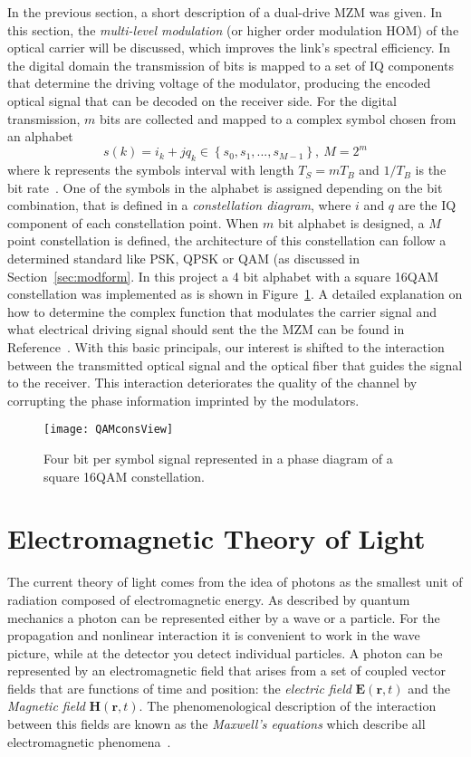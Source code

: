 In the previous section, a short description of a dual-drive MZM was given. In this section,  the \textit{multi-level modulation} (or higher order modulation HOM) of the optical carrier will be discussed, which improves the link's spectral efficiency. In the digital domain the transmission of bits is mapped to a set of IQ components that determine the driving voltage of the modulator, producing the encoded optical signal that can be decoded on the receiver side. For the digital transmission, $m$ bits are collected and mapped to a complex symbol chosen from an alphabet
\begin{equation}
s(k)=i_{k}+jq_{k} \in \left\{s_{0},s_{1},...,s_{M-1}\right\},\ M=2^{m} 
\end{equation}
where k represents the symbols interval with length $T_{S}=mT_{B}$ and $1/T_{B}$ is the bit rate~\cite{seimetz2005multi}. One of the symbols in the alphabet is assigned depending on the bit combination, that is defined in a \textit{constellation diagram}, where $i$ and $q$ are the IQ component of each constellation point. When $m$ bit alphabet is designed, a $M$ point constellation is defined, the architecture of this constellation can follow a determined standard like PSK, QPSK or QAM (as discussed in Section~\ref{sec:modform}. In this project a  4 bit alphabet with a square 16QAM constellation was implemented as is shown in Figure~\ref{fig:16QAMcons}. A detailed explanation on how to determine the complex function that modulates the carrier signal and what electrical driving signal should sent the the MZM can be found in Reference~\cite{seimetz2005multi}. With this basic principals, our interest is shifted to the interaction between the transmitted optical signal and the optical fiber that guides the signal to the receiver. This interaction deteriorates the quality of the channel by corrupting the phase information imprinted by the modulators.   
 
\begin{figure}[h]
\centering
\texttt{[image: QAMconsView]}
\caption{Four bit per symbol signal represented in a phase diagram of a square 16QAM constellation. }
\label{fig:16QAMcons}
\end{figure}

\section{Electromagnetic Theory of Light}

The current theory of light comes from the idea of photons as the smallest unit of radiation composed of electromagnetic energy. As described by quantum mechanics a photon can be represented either by a wave or a particle. For the propagation and nonlinear interaction it is convenient to work in the wave picture, while at the detector you detect individual particles. A photon can be represented by  an electromagnetic field that arises from a set of coupled vector fields that are functions of time and position: the \emph{electric field} $\textbf{E}(\textbf{r},t)$  and the  \emph{Magnetic field} $\textbf{H}(\textbf{r},t)$. The phenomenological description of the interaction between this fields  are known as the \emph{Maxwell's equations} which describe all electromagnetic phenomena~\cite{FiberAgrawal}. 
